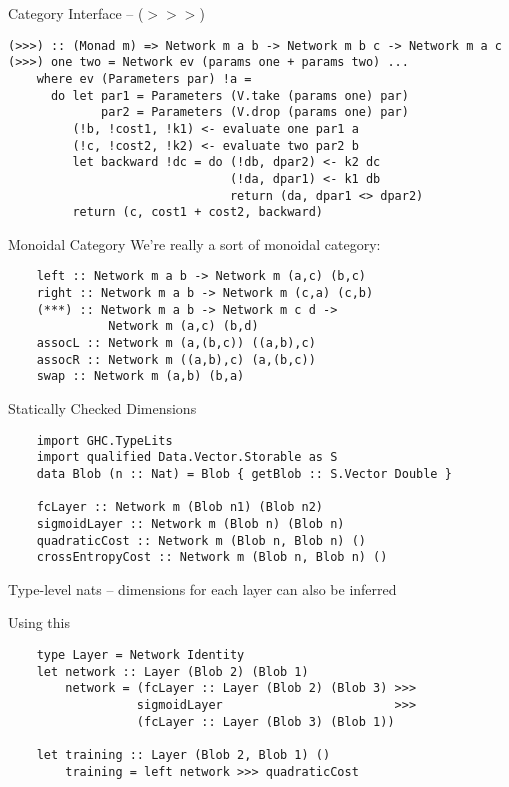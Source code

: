 \documentclass[10pt]{beamer}
\begin{document}
\begin{frame}[fragile]{Category Interface -- ($>>>$)}
  \begin{verbatim}
(>>>) :: (Monad m) => Network m a b -> Network m b c -> Network m a c
(>>>) one two = Network ev (params one + params two) ...
    where ev (Parameters par) !a =
      do let par1 = Parameters (V.take (params one) par)
             par2 = Parameters (V.drop (params one) par)
         (!b, !cost1, !k1) <- evaluate one par1 a
         (!c, !cost2, !k2) <- evaluate two par2 b
         let backward !dc = do (!db, dpar2) <- k2 dc
                               (!da, dpar1) <- k1 db
                               return (da, dpar1 <> dpar2)
         return (c, cost1 + cost2, backward)
  \end{verbatim}
\end{frame}

\begin{frame}[fragile]{Monoidal Category}
  We're really a sort of monoidal category:

  \begin{verbatim}
    left :: Network m a b -> Network m (a,c) (b,c)
    right :: Network m a b -> Network m (c,a) (c,b)
    (***) :: Network m a b -> Network m c d ->
              Network m (a,c) (b,d)
    assocL :: Network m (a,(b,c)) ((a,b),c)
    assocR :: Network m ((a,b),c) (a,(b,c))
    swap :: Network m (a,b) (b,a)
  \end{verbatim}

\end{frame}

\begin{frame}[fragile]{Statically Checked Dimensions}
  \begin{verbatim}
    import GHC.TypeLits
    import qualified Data.Vector.Storable as S
    data Blob (n :: Nat) = Blob { getBlob :: S.Vector Double }

    fcLayer :: Network m (Blob n1) (Blob n2)
    sigmoidLayer :: Network m (Blob n) (Blob n)
    quadraticCost :: Network m (Blob n, Blob n) ()
    crossEntropyCost :: Network m (Blob n, Blob n) ()
  \end{verbatim}

  Type-level nats -- dimensions for each layer can also be inferred
\end{frame}

\begin{frame}[fragile]{Using this}
  \begin{verbatim}
    type Layer = Network Identity
    let network :: Layer (Blob 2) (Blob 1)
        network = (fcLayer :: Layer (Blob 2) (Blob 3) >>>
                  sigmoidLayer                        >>>
                  (fcLayer :: Layer (Blob 3) (Blob 1))

    let training :: Layer (Blob 2, Blob 1) ()
        training = left network >>> quadraticCost
  \end{verbatim}
\end{frame}
\end{document}
